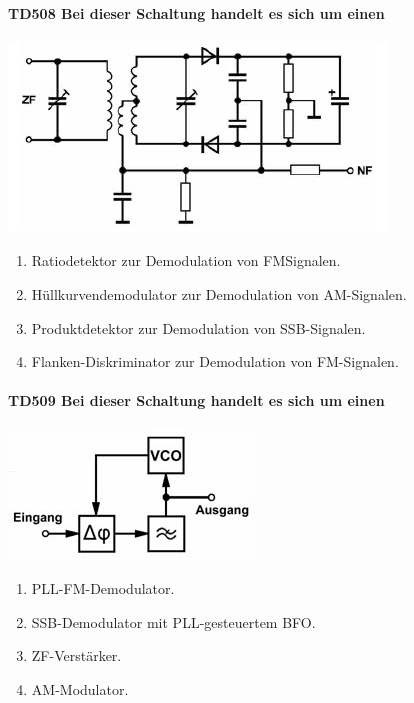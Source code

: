 \documentclass[8pt]{article}
\begin{document}
\begin{enumerate}
\begin{enumerate}[nolistsep,label=\Alph*]
\paragraph*{TD508 Bei dieser Schaltung handelt es sich um einen}
\begin{center}
	\begin{minipage}{\linewidth}
		\centering
		\includegraphics[scale=1.0]{pics/td508_a.jpg}
	\end{minipage}
\end{center}
\begin{enumerate}[nolistsep,label=\Alph*]
\item Ratiodetektor zur Demodulation von FMSignalen.
\item Hüllkurvendemodulator zur Demodulation von AM-Signalen.
\item Produktdetektor zur Demodulation von SSB-Signalen.
\item Flanken-Diskriminator zur Demodulation von FM-Signalen.
\end{enumerate}

\paragraph*{TD509 Bei dieser Schaltung handelt es sich um einen}
\begin{center}
	\begin{minipage}{\linewidth}
		\centering
		\includegraphics[scale=1.0]{pics/td509_a.jpg}
	\end{minipage}
\end{center}
\begin{enumerate}[nolistsep,label=\Alph*]
\item PLL-FM-Demodulator.
\item SSB-Demodulator mit PLL-gesteuertem BFO.
\item ZF-Verstärker.
\item AM-Modulator.
\end{enumerate}


\end{enumerate}
\end{enumerate}
\end{document}
